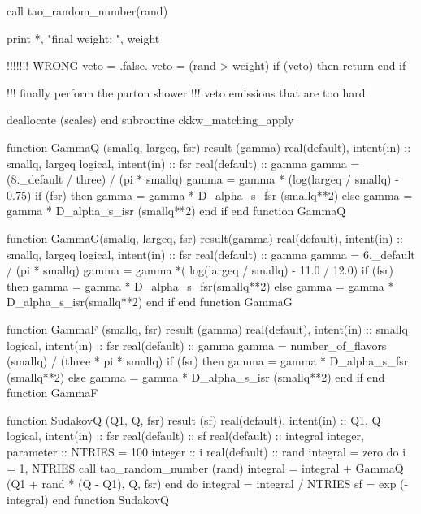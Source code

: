     call tao_random_number(rand)

    print *, "final weight: ", weight

    !!!!!!! WRONG
    veto = .false.
    veto = (rand > weight)
    if (veto) then
       return
    end if

    !!! finally perform the parton shower
    !!! veto emissions that are too hard

    deallocate (scales)
  end subroutine ckkw_matching_apply

\eatline
\nwendcode{}\nwdocspar
\nwenddocs{}\plusendmoddef
  function GammaQ (smallq, largeq, fsr) result (gamma)
    real(default), intent(in) :: smallq, largeq
    logical, intent(in) :: fsr
    real(default) :: gamma
    gamma = (8._default / three) / (pi * smallq)
    gamma = gamma * (log(largeq / smallq) - 0.75)
    if (fsr) then
       gamma = gamma * D_alpha_s_fsr (smallq**2)
    else
       gamma = gamma * D_alpha_s_isr (smallq**2)
    end if
  end function GammaQ

\eatline
\nwendcode{}\nwdocspar
\nwenddocs{}\plusendmoddef
  function GammaG(smallq, largeq, fsr) result(gamma)
    real(default), intent(in) :: smallq, largeq
    logical, intent(in) :: fsr
    real(default) :: gamma
    gamma = 6._default / (pi * smallq)
    gamma = gamma *( log(largeq / smallq) - 11.0 / 12.0)
    if (fsr) then
       gamma = gamma * D_alpha_s_fsr(smallq**2)
    else
       gamma = gamma * D_alpha_s_isr(smallq**2)
    end if
  end function GammaG

\eatline
\nwendcode{}\nwdocspar
\nwenddocs{}\plusendmoddef
  function GammaF (smallq, fsr) result (gamma)
    real(default), intent(in) :: smallq
    logical, intent(in) :: fsr
    real(default) :: gamma
    gamma = number_of_flavors (smallq) / (three * pi * smallq)
    if (fsr) then
       gamma = gamma * D_alpha_s_fsr (smallq**2)
    else
       gamma = gamma * D_alpha_s_isr (smallq**2)
    end if
  end function GammaF

\eatline
\nwendcode{}\nwdocspar
\nwenddocs{}\plusendmoddef
  function SudakovQ (Q1, Q, fsr) result (sf)
    real(default), intent(in) :: Q1, Q
    logical, intent(in) :: fsr
    real(default) :: sf
    real(default) :: integral
    integer, parameter :: NTRIES = 100
    integer :: i
    real(default) :: rand
    integral = zero
    do i = 1, NTRIES
       call tao_random_number (rand)
       integral = integral + GammaQ (Q1 + rand * (Q - Q1), Q, fsr)
    end do
    integral = integral / NTRIES
    sf = exp (-integral)
  end function SudakovQ

